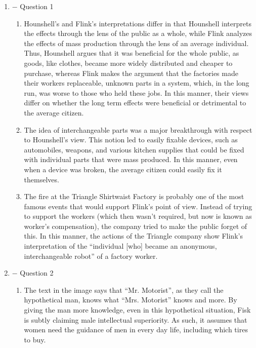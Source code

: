 \documentclass[12pt]{article}
\begin{document}
\begin{enumerate}

  \item $-$ Question 1

    \begin{enumerate}

      \item Hounshell's and Flink's interpretations differ in that Hounshell interprets the effects through the lens of the public as a whole, while Flink analyzes the effects of mass production through the lens of an average individual. Thus, Hounshell argues that it was beneficial for the whole public, as goods, like clothes, became more widely distributed and cheaper to purchase, whereas Flink makes the argument that the factories made their workers replaceable, unknown parts in a system, which, in the long run, was worse to those who held these jobs. In this manner, their views differ on whether the long term effects were beneficial or detrimental to the average citizen.

      \item The idea of interchangeable parts was a major breakthrough with respect to Hounshell's view. This notion led to easily fixable devices, such as automobiles, weapons, and various kitchen supplies that could be fixed with individual parts that were mass produced. In this manner, even when a device was broken, the average citizen could easily fix it themselves.

      \item The fire at the Triangle Shirtwaist Factory is probably one of the most famous events that would support Flink's point of view. Instead of trying to support the workers (which then wasn't required, but now is known as worker's compensation), the company tried to make the public forget of this. In this manner, the actions of the Triangle company show Flink's interpretation of the “individual [who] became an anonymous, interchangeable robot” of a factory worker.

    \end{enumerate}

    \newpage

  \item $-$ Question 2

    \begin{enumerate}

      \item The text in the image says that “Mr. Motorist”, as they call the hypothetical man, knows what “Mrs. Motorist” knows and more. By giving the man more knowledge, even in this hypothetical situation, Fisk is subtly claiming male intellectual superiority. As such, it assumes that women need the guidance of men in every day life, including which tires to buy.


\end{enumerate}
\end{enumerate}
\end{document}
